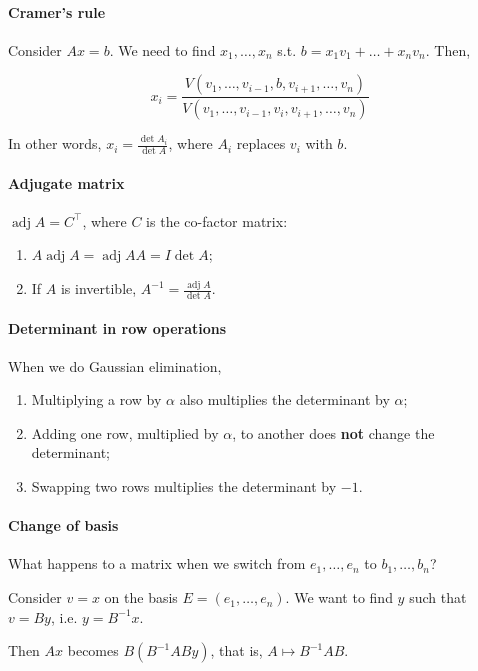 \documentclass{article}
\begin{document}
\paragraph{Cramer's rule} Consider $Ax=b$. We need to find $x_1,\dots,x_n$ s.t. $b = x_1 v_1 + \dots + x_n v_n$. Then,

$$
x_i = \frac{V(v_1,\dots,v_{i-1}, b, v_{i+1}, \dots, v_n)}{V(v_1,\dots,v_{i-1}, v_i, v_{i+1}, \dots, v_n)}
$$

In other words, $x_i = \frac{\det A_i}{\det A}$, where $A_i$ replaces $v_i$ with $b$.

\paragraph{Adjugate matrix} $\operatorname{adj} A = C^\top$, where $C$ is the co-factor matrix:

\begin{enumerate}
    \item $A \operatorname{adj} A = \operatorname{adj} A A = I \det A$;
    \item If $A$ is invertible, $A^{-1} = \frac{\operatorname{adj} A}{\det A}$.
\end{enumerate}

\paragraph{Determinant in row operations} When we do Gaussian elimination,

\begin{enumerate}
    \item Multiplying a row by $\alpha$ also multiplies the determinant by $\alpha$;
    \item Adding one row, multiplied by $\alpha$, to another does \textbf{not} change the determinant;
    \item Swapping two rows multiplies the determinant by $-1$.
\end{enumerate}

\paragraph{Change of basis} What happens to a matrix when we switch from $e_1,\dots,e_n$ to $b_1,\dots, b_n$?

Consider $v = x$ on the basis $E=(e_1,\dots,e_n)$. We want to find $y$ such that $v = By$, i.e. $y = B^{-1} x$.

Then $Ax$ becomes $B(B^{-1}ABy)$, that is, $A \mapsto B^{-1} A B$.
\end{document}
